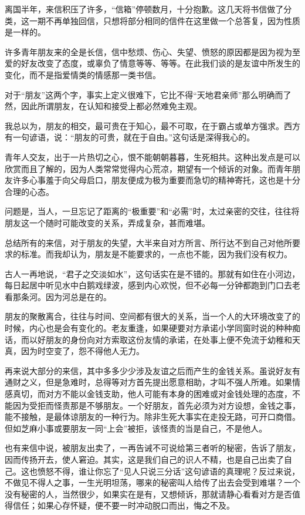 \par {}
\par 离国半年，来信积压了许多，“信箱”停顿数月，十分抱歉。这几天将书信做了分类，这一期不再单独回信，只想将部分相同的信件在这里做一个总答复，因为性质是一样的。
\par 许多青年朋友来的全是长信，信中愁烦、伤心、失望、愤怒的原因都是因为视为至爱的好友改变了态度，或辜负了情意等等、等等。在此我们谈的是友谊中所发生的变化，而不是指爱情类的情感那一类书信。
\par 对于“朋友”这两个字，事实上定义很难下，它比不得“天地君亲师”那么明确而了然，因此所谓朋友，在认知和接受上都必然难免主观。
\par 我总以为，朋友的相交，最可贵在于知心，最不可取，在于霸占或单方强求。西方有一句谚语，说：“朋友的可贵，就在于自由。”这句话是深得我心的。
\par 青年人交友，出于一片热切之心，恨不能朝朝暮暮，生死相共。这种出发点是可以欣赏而且了解的，因为人类常常觉得内心荒凉，期望有一个倾诉的对象。而青年朋友许多心事羞于向父母启口，朋友便成为极为重要而急切的精神寄托，这也是十分合理的心态。
\par 问题是，当人，一旦忘记了距离的“极重要”和“必需”时，太过亲密的交往，往往将朋友这一个随时可能改变的关系，弄成复杂，甚而难堪。
\par 总结所有的来信，对于朋友的失望，大半来自对方所言、所行达不到自己对他所要求的标准。而我却认为，朋友是不能要求的，一点也不能，因为我们没有权力。
\par 古人一再地说，“君子之交淡如水”，这句话实在是不错的。那就有如住在小河边，每日起居中听见水中白鹅戏绿波，感到内心欢悦，但不必每一分钟都跑到门口去老看那条河。因为河总是在的。
\par 朋友的聚散离合，往往与时间、空间都有很大的关系，当一个人的大环境改变了的时候，内心也是会有变化的。老友重逢，如果硬要对方承诺小学同窗时说的种种痴话，而以好朋友的身份向对方索取这份友情的承诺，在处事上便不免流于幼稚和天真，因为时空变了，怨不得他人无力。
\par 再来说大部分的来信，其中多多少少涉及友谊之后而产生的金钱关系。虽说好友有通财之义，但是急难时，总得等对方首先提出愿意相助，才叫不强人所难。如果情感真切，而对方不能以金钱支助，他人可能有本身的困难或对金钱处理的态度，不能因为受拒而怪责那是不够朋友。一个好朋友，首先必须为对方设想，金钱之事，能不接触，是最体谅朋友的一种行为。除非生死大事实在走投无路，可开口商借。但如芝麻小事或要朋友一同“上会”被拒，该怪责的当是自己，不是他人。
\par 也有来信中说，被朋友出卖了，一再告诫不可说给第三者听的秘密，告诉了朋友，因而传扬开去，使人窘迫。其实，这是我们自己的识人不精，也是自己出卖了自己。这也愤怒不得，谁让你忘了“见人只说三分话”这句谚语的真理呢？反过来说，不做见不得人之事，一生光明坦荡，哪来的秘密叫人给传了出去会受到难堪？一个没有秘密的人，当然很少，如果实在是有，又想倾诉，那就请静心看看对方是否值得信任；如果心存怀疑，便不要一时冲动脱口而出，悔之不及。
